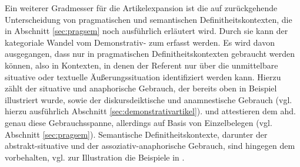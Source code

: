 Ein weiterer Gradmesser für die Artikelexpansion  ist die auf \textcite{Lobner1985,Lobner1998} zurückgehende Unterscheidung   von pragmatischen  und semantischen   Definitheitskontexten,  die in Abschnitt \ref{sec:pragsem} noch ausführlich erläutert wird. Durch sie kann der kategoriale Wandel vom Demonstrativ-  zum  erfasst werden. Es wird davon ausgegangen, dass  nur in pragmatischen Definitheitskontexten  gebraucht werden können, also in Kontexten, in denen der Referent nur über die unmittelbare situative oder textuelle Äußerungssituation identifiziert werden kann. Hierzu zählt der situative  und anaphorische  Gebrauch, der bereits oben in Beispiel  illustriert wurde, sowie der diskursdeiktische  und anamnestische  Gebrauch (vgl. hierzu ausführlich Abschnitt \ref{sec:demonstrativartikel}). \textcite[84--88]{Philippi1997} und \textcite[112--117]{Demske2001} attestieren dem ahd.  genau diese Gebrauchsspanne, allerdings auf Basis von Einzelbelegen (vgl. Abschnitt \ref{sec:pragsem}). Semantische Definitheitskontexte,  darunter der abstrakt-situative  und der assoziativ-anaphorische  Gebrauch, sind hingegen dem  vorbehalten, vgl. zur Illustration die Beispiele in .\largerpage[2]

